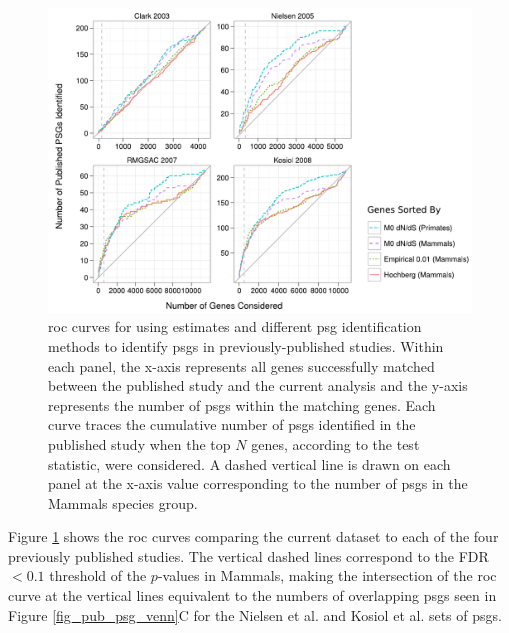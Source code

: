 \begin{figure}
\centering
\includegraphics[scale=0.78]{Figs/psg_rocs.pdf}
\caption{\ac{roc} curves for using \dnds estimates and different
  \ac{psg} identification methods to identify \acp{psg} in
  previously-published studies. Within each panel, the x-axis
  represents all genes successfully matched between the published
  study and the current analysis and the y-axis represents the number
  of \acp{psg} within the matching genes. Each curve traces the
  cumulative number of \acp{psg} identified in the published study
  when the top $N$ genes, according to the test statistic, were
  considered. A dashed vertical line is drawn on each panel at the
  x-axis value corresponding to the number of \psgeone \acp{psg} in
  the Mammals species group.}
\label{fig_psg_rocs}
\end{figure}

Figure \ref{fig_psg_rocs} shows the \ac{roc} curves comparing the
current dataset to each of the four previously published studies. The
vertical dashed lines correspond to the FDR$<0.1$ threshold of the
\psgeone $p$-values in Mammals, making the intersection of the
\psgeone \ac{roc} curve at the vertical lines equivalent to the
numbers of overlapping \acp{psg} seen in Figure
\ref{fig_pub_psg_venn}C for the Nielsen et
al. \citeyearpar{Nielsen2005} and Kosiol et
al. \citeyearpar{Kosiol2008} sets of \acp{psg}.

